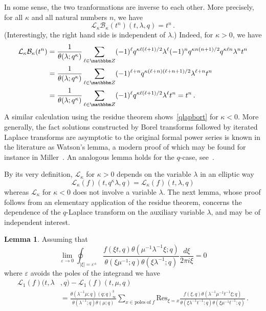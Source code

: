\documentclass[12pt,reqno]{amsart}
\theoremstyle{definition}
\newtheorem{lemma}[theorem]{Lemma}
\def\BZ{\mathbbm Z}
\def\Res{\mathrm{Res}}
\def\ve{\varepsilon}
\def\be{\begin{equation}}
\def\ee{\end{equation}}
\def\Bor{\mathcal{B}}
\def\Lap{\mathcal{L}}
\begin{document}
In some sense, the two tranformations are inverse to each other. More precisely,
for all $\kappa$ and all natural numbers $n$, we have
\be
\label{qlapbort}
\Lap_{\kappa}\Bor_{\kappa}(t^{n})(t,\lambda,q) = t^n \,.
\ee
(Interestingly, the right hand side is independent of $\lambda$.) Indeed,
for $\kappa >0$, we have 
\be
\begin{aligned}
\Lap_{\kappa}\Bor_{\kappa}(t^{n})
&=
\frac{1}{\theta(\lambda;q^\kappa)}\sum_{\ell\in\BZ}(-1)^{\ell}q^{\kappa\ell(\ell+1)/2}
\lambda^{\ell}(-1)^{n}q^{\kappa n(n+1)/2}q^{\kappa\ell n}\lambda^{n}t^{n}\\
&=
\frac{1}{\theta(\lambda;q^\kappa)}\sum_{\ell\in\BZ}(-1)^{\ell+n}
q^{\kappa(\ell+n)(\ell+n+1)/2}\lambda^{\ell+n}t^{n}\\
&=
\frac{1}{\theta(\lambda;q^\kappa)}\sum_{\ell\in\BZ}(-1)^{\ell}
q^{\kappa\ell(\ell+1)/2}\lambda^{\ell}t^{n} = t^n \,.
\end{aligned}
\ee
A similar calculation using the residue theorem shows~\eqref{qlapbort}
for $\kappa <0$.
More generally, the fact solutions constructed by Borel transforms followed
by iterated Laplace transforms are asymptotic to the original formal power series is
known in the literature as Watson's lemma, %
a modern proof of which may be found for instance in
Miller~\cite[p.~53, Prop.~2.1]{Miller:applied}. An analogous lemma holds for
the $q$-case, see~\cite[Prop.2.9]{Dreyfus:building}.

By its very definition, $\Lap_\kappa$ for $\kappa>0$ depends on the
variable $\lambda$ in an elliptic way
\be
\label{lapelliptic}
\Lap_\kappa(f)(t,q^{\kappa}\lambda,q)=\Lap_\kappa(f)(t,\lambda,q) 
\ee
whereas $\Lap_\kappa$ for $\kappa <0$ does not involve a variable $\lambda$. 
The next lemma, whose proof follows from an elementary application of the
residue theorem, concerns the dependence of the $q$-Laplace transform on the
auxiliary variable $\lambda$, and may be of independent interest.

\begin{lemma}
\label{lem.fund}
Assuming that
\be
\lim_{\ve\rightarrow 0}\oint_{|\xi|=\ve^{\pm}}
\frac{f(\xi t,q)\theta(\mu^{-1}\lambda^{-1}\xi;q)}{\theta(\xi\mu^{-1};q)
  \theta(\xi\lambda^{-1};q)}\frac{d\xi}{2\pi i\xi}=0
\ee
where $\ve$ avoids the poles of the integrand we have  
\be
\begin{aligned}
\Lap_{1}(f)(t,\lambda &,q)-\Lap_{1}(f)(t,\mu,q)\\
&=
\frac{\theta(\lambda ^{-1}\mu ;q)(q;q)_{\infty}^{3}}{\theta(\lambda ^{-1};q)
  \theta(\mu ;q)}\sum_{x\in\mathrm{poles\;of}\;f}\Res_{\xi=x}\frac{f(\xi,q)
  \theta(\lambda ^{-1}\mu ^{-1}t^{-1}\xi;q)}{\theta(\xi\lambda ^{-1}t^{-1};q)
  \theta(\xi\mu ^{-1}t^{-1};q)} \,.
\end{aligned}
\ee
\end{lemma}
\end{document}

